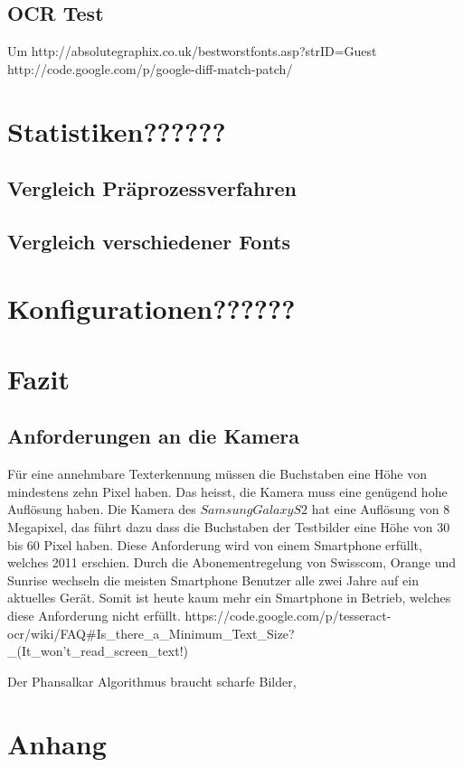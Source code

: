 \documentclass[10pt]{article}
\begin{document}
\subsection{OCR Test}
Um 
http://absolutegraphix.co.uk/bestworstfonts.asp?strID=Guest
http://code.google.com/p/google-diff-match-patch/


\section{Statistiken??????}

\subsection{Vergleich Präprozessverfahren}

\subsection{Vergleich verschiedener Fonts}

\section{Konfigurationen??????}

\section{Fazit}

\subsection{Anforderungen an die Kamera}
Für eine annehmbare Texterkennung müssen die Buchstaben eine Höhe von mindestens zehn Pixel haben. Das heisst, die Kamera muss eine genügend hohe Auflösung haben. Die Kamera des $Samsung Galaxy S2$ hat eine Auflösung von 8 Megapixel, das führt dazu dass die Buchstaben der Testbilder eine Höhe von 30 bis 60 Pixel haben. Diese Anforderung wird von einem Smartphone erfüllt, welches 2011 erschien. Durch die Abonementregelung von Swisscom, Orange und Sunrise wechseln die meisten Smartphone Benutzer alle zwei Jahre auf ein aktuelles Gerät. Somit ist heute kaum mehr ein Smartphone in Betrieb, welches diese Anforderung nicht erfüllt.
https://code.google.com/p/tesseract-ocr/wiki/FAQ#Is_there_a_Minimum_Text_Size?_(It_won't_read_screen_text!)

Der Phansalkar Algorithmus braucht scharfe Bilder,


\section{Anhang}

\end{document}
